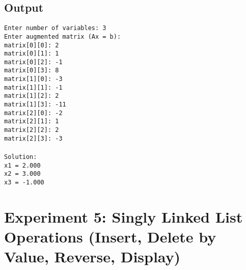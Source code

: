 \documentclass[12pt,a4paper]{article}
\begin{document}
\subsection*{Output}
\begin{tcolorbox}[terminalstyle, title=Sample Output]
\texttt{Enter number of variables: 3 \\
Enter augmented matrix (Ax = b): \\
matrix[0][0]: 2 \\
matrix[0][1]: 1 \\
matrix[0][2]: -1 \\
matrix[0][3]: 8 \\
matrix[1][0]: -3 \\
matrix[1][1]: -1 \\
matrix[1][2]: 2 \\
matrix[1][3]: -11 \\
matrix[2][0]: -2 \\
matrix[2][1]: 1 \\
matrix[2][2]: 2 \\
matrix[2][3]: -3 \\
\\
Solution: \\
x1 = 2.000 \\
x2 = 3.000 \\
x3 = -1.000}
\end{tcolorbox}

\newpage
\section*{Experiment 5: Singly Linked List Operations (Insert, Delete by Value, Reverse, Display)}
\end{document}
